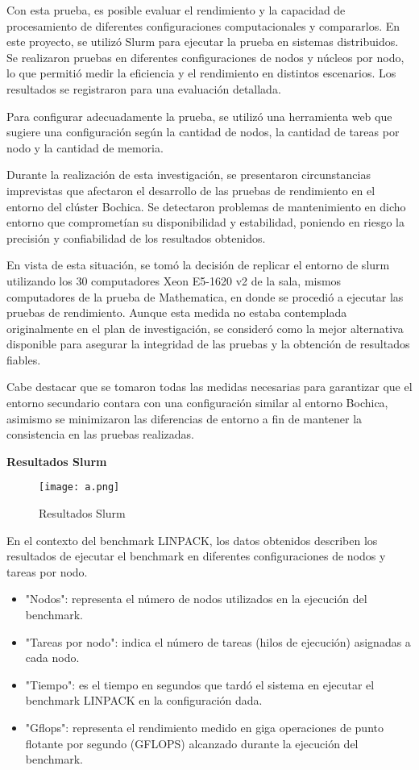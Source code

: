 \begin{spacing}{1.5}
Con esta prueba, es posible evaluar el rendimiento y la capacidad de procesamiento de diferentes configuraciones computacionales y compararlos. En este proyecto, se utilizó Slurm para ejecutar la prueba en sistemas distribuidos. Se realizaron pruebas en diferentes configuraciones de nodos y núcleos por nodo, lo que permitió medir la eficiencia y el rendimiento en distintos escenarios. Los resultados se registraron para una evaluación detallada.

Para configurar adecuadamente la prueba, se utilizó una herramienta web que sugiere una configuración según la cantidad de nodos, la cantidad de tareas por nodo y la cantidad de memoria. \cite{tune-hpl-dat-file}

Durante la realización de esta investigación, se presentaron circunstancias imprevistas que afectaron el desarrollo de las pruebas de rendimiento en el entorno del clúster Bochica. Se detectaron problemas de mantenimiento en dicho entorno que comprometían su disponibilidad y estabilidad, poniendo en riesgo la precisión y confiabilidad de los resultados obtenidos.

En vista de esta situación, se tomó la decisión de replicar el entorno de slurm utilizando los 30 computadores Xeon E5-1620 v2 de la sala, mismos computadores de la prueba de Mathematica, en donde se procedió a ejecutar las pruebas de rendimiento. Aunque esta medida no estaba contemplada originalmente en el plan de investigación, se consideró como la mejor alternativa disponible para asegurar la integridad de las pruebas y la obtención de resultados fiables.

Cabe destacar que se tomaron todas las medidas necesarias para garantizar que el entorno secundario contara con una configuración similar al entorno Bochica, asimismo se minimizaron las diferencias de entorno a fin de mantener la consistencia en las pruebas realizadas.

\textbf{Resultados Slurm}

\begin{figure}[h]
      \centering
      \texttt{[image: a.png]}
      \caption{Resultados Slurm}
      \label{fig:etiqueta}
\end{figure}

En el contexto del benchmark LINPACK, los datos obtenidos describen los resultados de ejecutar el benchmark en diferentes configuraciones de nodos y tareas por nodo.

\begin{itemize}
      \item "Nodos": representa el número de nodos utilizados en la ejecución del benchmark.
      \item "Tareas por nodo": indica el número de tareas (hilos de ejecución) asignadas a cada nodo.
      \item "Tiempo": es el tiempo en segundos que tardó el sistema en ejecutar el benchmark LINPACK en la configuración dada.
      \item "Gflops": representa el rendimiento medido en giga operaciones de punto flotante por segundo (GFLOPS) alcanzado durante la ejecución del benchmark.
\end{itemize}


\end{spacing}
